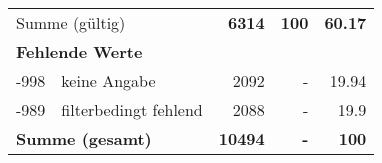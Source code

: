 \begin{longtable}{lXrrr}
     \midrule
     \multicolumn{2}{l}{Summe (gültig)} &
       \textbf{\num{6314}} &
     \textbf{100} &
       \textbf{\num[round-mode=places,round-precision=2]{60,17}} \\
     \multicolumn{5}{l}{\textbf{Fehlende Werte}}\\
       -998 &
       keine Angabe &
         \num{2092} &
        - &
         \num[round-mode=places,round-precision=2]{19,94} \\
       -989 &
       filterbedingt fehlend &
         \num{2088} &
        - &
         \num[round-mode=places,round-precision=2]{19,9} \\
     \midrule
     \multicolumn{2}{l}{\textbf{Summe (gesamt)}} &
          \textbf{\num{10494}} &
        \textbf{-} &
        \textbf{100} \\
     \bottomrule
     \end{longtable}
     
